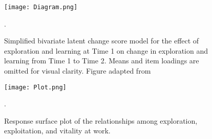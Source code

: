 \documentclass[man]{apa7}
\begin{document}

\begin{figure}[t]
\texttt{[image: Diagram.png]}
\caption{Simplified bivariate latent change score model for the effect of exploration and learning at Time 1 on change in exploration and learning from Time 1 to Time 2. Means and item loadings are omitted for visual clarity. Figure adapted from \textcite{Kievit2018}}.
\end{figure}


\begin{figure}[t]
\texttt{[image: Plot.png]}
\caption{Response surface plot of the relationships among exploration, exploitation, and vitality at work.}.
\end{figure}

\end{document}
